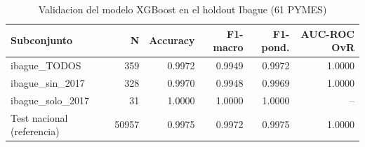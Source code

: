 \begin{table}[htbp]
\centering
\caption{Validacion del modelo XGBoost en el holdout Ibague (61 PYMES)}
\label{tab:metricas_ibague}
\begin{tabular}{lrrrrr}
\toprule
Subconjunto & N & Accuracy & F1-macro & F1-pond. & AUC-ROC OvR \\
\midrule
ibague\_TODOS & 359 & 0.9972 & 0.9949 & 0.9972 & 1.0000 \\
ibague\_sin\_2017 & 328 & 0.9970 & 0.9948 & 0.9969 & 1.0000 \\
ibague\_solo\_2017 & 31 & 1.0000 & 1.0000 & 1.0000 & -- \\
\midrule
Test nacional (referencia) & 50957 & 0.9975 & 0.9972 & 0.9975 & 1.0000 \\
\bottomrule
\end{tabular}
\end{table}